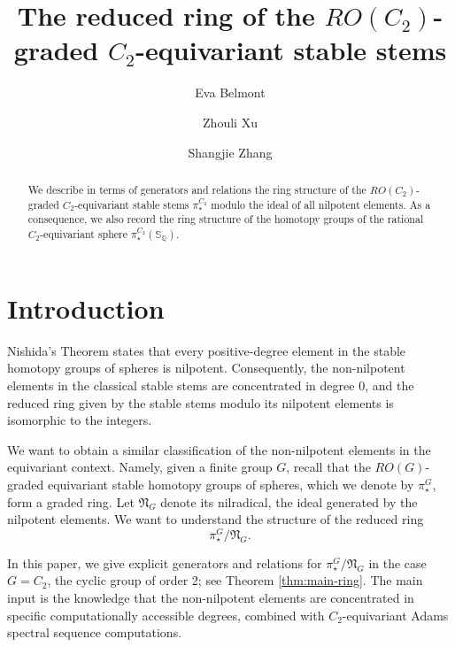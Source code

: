 \documentclass[psamsfonts]{amsart}
\newcommand{\fN}{\mathfrak N}
\theoremstyle{definition}
\theoremstyle{remark}
\newcommand{\EvaNote}[1]
   {\marginpar{\raggedright\smaller \smaller \color{Periwinkle}#1}}
\numberwithin{equation}{section}
\begin{document}
\title{The reduced ring of the $RO(C_2)$-graded $C_2$-equivariant stable stems}

\author{Eva Belmont}
\address{Department of Mathematics, University of California San Diego, La Jolla, CA 92093, USA}


\author{Zhouli Xu}
\address{Department of Mathematics, University of California San Diego, La Jolla, CA 92093, USA}

\author{Shangjie Zhang}
\address{Department of Mathematics, University of California San Diego, La Jolla, CA 92093, USA}

\maketitle

\begin{abstract}
We describe in terms of generators and relations the ring structure of the $RO(C_2)$-graded $C_2$-equivariant stable stems $\pi_\star^{C_2}$ modulo the ideal of all nilpotent elements.
As a consequence, we also record the ring structure of the homotopy groups of the rational $C_2$-equivariant sphere $\pi_\star^{C_2}(\mathbb{S}_\mathbb{Q})$.
\end{abstract}


\section{Introduction}
Nishida's Theorem states that every positive-degree element in the stable homotopy groups of spheres is nilpotent. Consequently, the non-nilpotent elements in the classical stable stems are concentrated in degree 0, and the reduced ring given by the stable stems modulo its nilpotent elements is isomorphic to the integers.

We want to obtain a similar classification of the non-nilpotent elements in the equivariant context. Namely, given a finite group $G$, recall that the $RO(G)$-graded equivariant stable homotopy groups of spheres, which we denote by $\pi_\star^G$, form a graded ring. Let $\fN_G$ denote its nilradical, the ideal generated by the nilpotent elements. We want to understand the structure of the reduced ring 
\[\pi_{\star}^G/\fN_G.\]

In this paper, we give explicit generators and relations for $\pi_\star^{G}/\fN_G$ in
the case $G=C_2$, the cyclic group of order 2; see Theorem \ref{thm:main-ring}.
The main input is the knowledge that the non-nilpotent elements are concentrated in specific computationally accessible degrees, combined with $C_2$-equivariant Adams spectral sequence 
computations.
\end{document}
